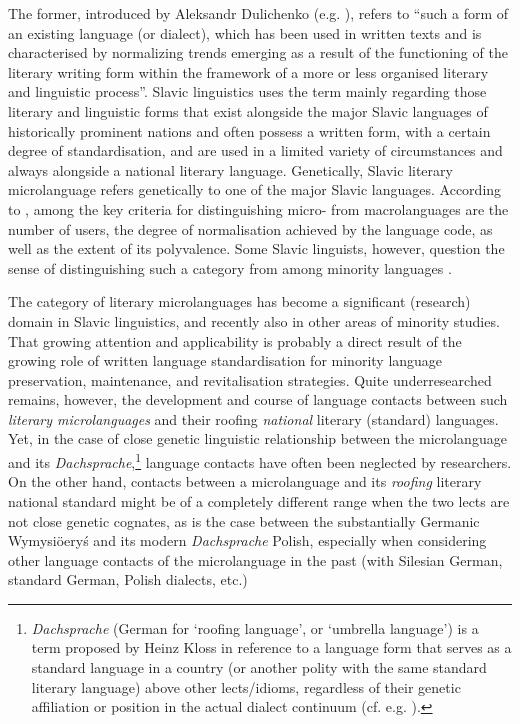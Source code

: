 \documentclass[output=paper]{langscibook}
\begin{document}
The former, introduced by Aleksandr Dulichenko (e.g. \citeyear[27]{dulichenko_sovremennoe_2006}), refers to “such a form of an existing language (or dialect), which has been used in written texts and is characterised by normalizing trends emerging as a result of the functioning of the literary writing form within the framework of a more or less organised literary and linguistic process”. Slavic linguistics uses the term mainly regarding those literary and linguistic forms that exist alongside the major Slavic languages of historically prominent nations and often possess a written form, with a certain degree of standardisation, and are used in a limited variety of circumstances and always alongside a national literary language. Genetically, Slavic literary microlanguage refers genetically to one of the major Slavic languages. According to \citet[43]{balowska_mikrojkezyki_1999}, among the key criteria for distinguishing micro- from macrolanguages are the number of users, the degree of normalisation achieved by the language code, as well as the extent of its polyvalence. Some Slavic linguists, however, question the sense of distinguishing such a category from among minority languages \citep{stern_languages_2018}.

The category of literary microlanguages has become a significant (research) domain in Slavic linguistics, and recently also in other areas of minority studies. That growing attention and applicability is probably a direct result of the growing role of written language standardisation for minority language preservation, maintenance, and revitalisation strategies. Quite underresearched remains, however, the development and course of language contacts between such \textit{literary microlanguages} and their roofing \textit{national} literary (standard) languages. Yet, in the case of close genetic linguistic relationship between the microlanguage and its \textit{Dachsprache},\footnote{\textit{Dachsprache} (German for ‘roofing language’, or ‘umbrella language’) is a term proposed by Heinz Kloss in reference to a language form that serves as a standard language in a country (or another polity with the same standard literary language) above other lects/idioms, regardless of their genetic affiliation or position in the actual dialect continuum (cf. e.g. \citealt{kloss_abstand_1967}).} language contacts have often been neglected by researchers. On the other hand, contacts between a microlanguage and its \textit{roofing} literary national standard might be of a completely different range when the two lects are not close genetic cognates, as is the case between the substantially Germanic Wymysiöeryś and its modern \textit{Dachsprache} Polish, especially when considering other language contacts of the microlanguage in the past (with Silesian German, standard German, Polish dialects, etc.)
\end{document}
